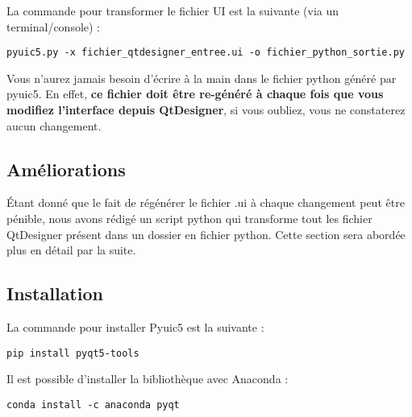 La commande pour transformer le fichier UI est la suivante (via un terminal/console) :
\begin{lstlisting}
pyuic5.py -x fichier_qtdesigner_entree.ui -o fichier_python_sortie.py
\end{lstlisting}

Vous n'aurez jamais besoin d'écrire à la main dans le fichier python généré par pyuic5. En effet, \textbf{ce fichier doit être re-généré à chaque fois que vous modifiez l'interface depuis QtDesigner}, si vous oubliez,  vous ne constaterez aucun changement.

\subsection{Améliorations}

Étant donné que le fait de régénérer le fichier .ui à chaque changement peut être pénible, nous avons rédigé un script python qui transforme tout les fichier QtDesigner présent dans un dossier en fichier python. \newline
Cette section sera abordée plus en détail par la suite.

\subsection{Installation}

La commande pour installer Pyuic5 est la suivante : \newline

\begin{lstlisting}
pip install pyqt5-tools
\end{lstlisting}
Il est possible d'installer la bibliothèque avec Anaconda : \newline
\begin{lstlisting}
conda install -c anaconda pyqt
\end{lstlisting}
